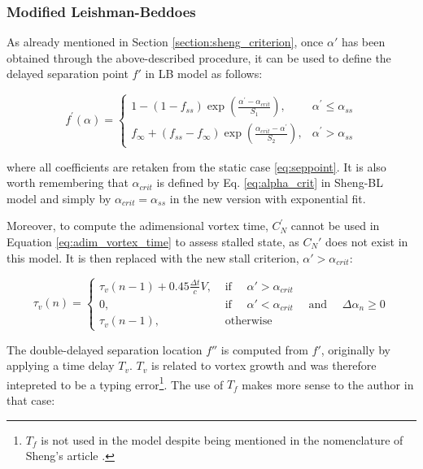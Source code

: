 \subsubsection{Modified Leishman-Beddoes}
\label{section:Sheng-LB}

As already mentioned in Section \ref{section:sheng_criterion}, once $\alpha'$ has been obtained through the above-described procedure, it can be used to define the delayed separation point $f'$ in LB model as follows: 

\begin{equation}
	f^{\prime}(\alpha)=\left\{\begin{array}{ll}
		1-(1-f_{ss}) \exp \left(\frac{\alpha^{\prime}-\alpha_{crit}}{S_{1}}\right), & \alpha^{\prime} \leq \alpha_{ss} \\
		f_\infty + (f_{ss}-f_\infty) \exp \left(\frac{\alpha_{crit}-\alpha^{\prime}}{S_{2}}\right), & \alpha^{\prime}>\alpha_{ss}
		\end{array}\right.
		\label{eq:fp_sheng}
\end{equation}

\noindent where all coefficients are retaken from the static case \eqref{eq:seppoint}. It is also worth remembering that $\alpha_{crit}$ is defined by Eq. \eqref{eq:alpha_crit} in Sheng-BL model and simply by $\alpha_{crit} = \alpha_{ss}$ in the new version with exponential fit. 

Moreover, to compute the adimensional vortex time, $C_N^{\prime}$ cannot be used in Equation \eqref{eq:adim_vortex_time} to assess stalled state, as $C_N'$ does not exist in this model. It is then replaced with the new stall criterion, $\alpha'>\alpha_{crit}$:

\begin{equation}
	\tau_{v}(n)=\left\{\begin{array}{ll}
		\tau_{v}(n-1)+0.45 \frac{\Delta t}{c} V, & \text { if } \quad \alpha'>\alpha_{crit}\\
		0, & \text { if } \quad \alpha'<\alpha_{crit} \quad \text { and } \quad \Delta \alpha_{n} \geq 0 \\
		\tau_{v}(n-1), & \text { otherwise }
		\end{array}\right.
	\label{eq:adim_vortex_time_sheng}	
\end{equation}

The double-delayed separation location $f''$ is computed from $f'$, originally by applying a time delay $T_v$.  $T_v$ is related to vortex growth and was therefore intepreted to be a typing error\footnote{$T_f$ is not used in the model despite being mentioned in the nomenclature of Sheng's article \cite{sheng_modified_2008}.}. The use of $T_f$ makes more sense to the author in that case: 

